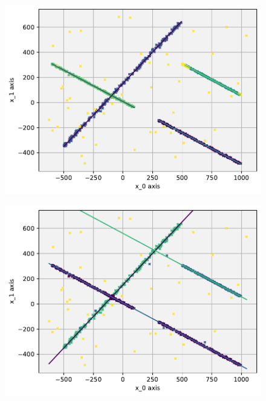 \begin{figure}[h]
    \centering
    \begin{minipage}[t]{.5\textwidth}
      \centering  
      \captionsetup{width=.9\linewidth}
      \includegraphics[width=\textwidth]{figure_method_grid/LocalLinearCorrelationsWithColoredCorrs.pdf}
      \label{fig:evalLocal}
    \end{minipage}%
    \begin{minipage}[t]{.5\textwidth}
      \centering
      \captionsetup{width=.9\linewidth}
      \includegraphics[width=\textwidth]{figure_method_grid/RelabeledCorrelationsWithColoredCorrs.pdf}
      \label{fig:evalRelabeled}
    \end{minipage}

\end{figure}

